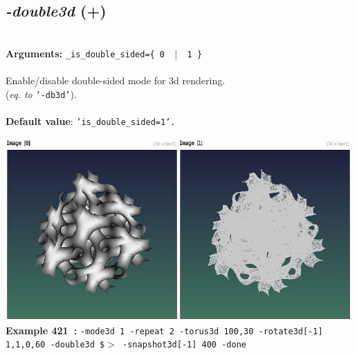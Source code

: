 \documentclass[a4paper,11pt,twoside]{book}
\begin{document}
\subsection{\emph{-double3d} (+)}\vspace*{-0.5em}
~\\\textbf{Arguments: } 
{\small \texttt{\_is\_double\_sided=\{ 0 ~$|$~ 1 \}}}\\~\\
Enable/disable double-sided mode for 3d rendering.
~\\(\emph{eq. to} {\small \texttt{'-db3d'}}).
~\\~\\\textbf{Default value}: {\small \texttt{'is\_double\_sided=1'.}}
\begin{center}\includegraphics[keepaspectratio=true,height=7cm,width=\textwidth]{img/gmic_def421.jpg}\\
{\footnotesize \textbf{Example 421~:} \texttt{-mode3d 1 -repeat 2 -torus3d 100,30 -rotate3d[-1] 1,1,0,60 -double3d \$$>$ -snapshot3d[-1] 400 -done}}
\end{center}
\end{document}
